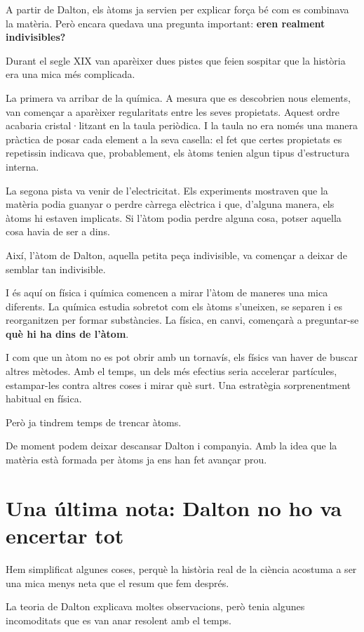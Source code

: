 A partir de Dalton, els àtoms ja servien per explicar força bé com es combinava la matèria. Però encara quedava una pregunta important: \textbf{eren realment indivisibles?}

Durant el segle XIX van aparèixer dues pistes que feien sospitar que la història era una mica més complicada.

La primera va arribar de la química. A mesura que es descobrien nous elements, van començar a aparèixer regularitats entre les seves propietats. Aquest ordre acabaria cristal·litzant en la taula periòdica. I la taula no era només una manera pràctica de posar cada element a la seva casella: el fet que certes propietats es repetissin indicava que, probablement, els àtoms tenien algun tipus d’estructura interna.

La segona pista va venir de l’electricitat. Els experiments mostraven que la matèria podia guanyar o perdre càrrega elèctrica i que, d’alguna manera, els àtoms hi estaven implicats. Si l’àtom podia perdre alguna cosa, potser aquella cosa havia de ser a dins.

Així, l’àtom de Dalton, aquella petita peça indivisible, va començar a deixar de semblar tan indivisible.

I és aquí on física i química comencen a mirar l’àtom de maneres una mica diferents. La química estudia sobretot com els àtoms s’uneixen, se separen i es reorganitzen per formar substàncies. La física, en canvi, començarà a preguntar-se \textbf{què hi ha dins de l’àtom}.

I com que un àtom no es pot obrir amb un tornavís, els físics van haver de buscar altres mètodes. Amb el temps, un dels més efectius seria accelerar partícules, estampar-les contra altres coses i mirar què surt. Una estratègia sorprenentment habitual en física.

Però ja tindrem temps de trencar àtoms.

De moment podem deixar descansar Dalton i companyia. Amb la idea que la matèria està formada per àtoms ja ens han fet avançar prou.

\section{Una última nota: Dalton no ho va encertar tot}

Hem simplificat algunes coses, perquè la història real de la ciència acostuma a ser una mica menys neta que el resum que fem després.

La teoria de Dalton explicava moltes observacions, però tenia algunes incomoditats que es van anar resolent amb el temps.

